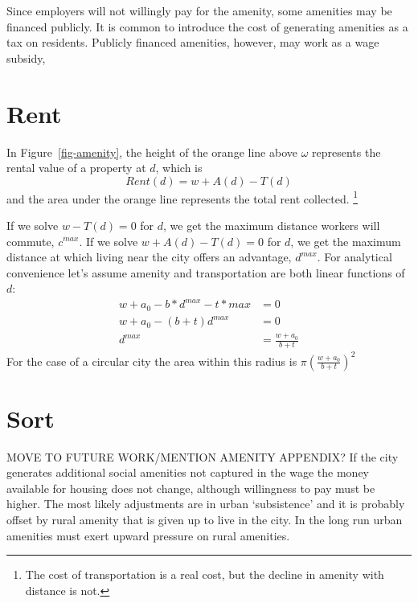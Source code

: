 
Since employers will not willingly pay for the amenity, some amenities may be financed publicly. It is common to introduce the cost of generating amenities as a tax on residents. Publicly financed amenities, however, may work as a wage subsidy,  	

\section{Rent}
In Figure~\ref{fig-amenity}, the height of the orange line above $\omega$ represents the rental value of a property at $d$, which is 
\begin{equation}
Rent(d)  =  w  + A(d) - T(d)	
\label{eqn-rent-at-d}\end{equation}
 and the area under the orange line represents the total rent collected.
 \footnote{The cost of transportation is a real cost, but the decline in amenity with distance is not.}
 
 If we solve $w-T(d)=0$ for $d$, we get the maximum  distance workers will commute, $c^{max}$. 
If we solve $w+A(d)-T(d)=0$ for $d$, we get the maximum  distance at which living near the city offers an advantage, $d^{max}$. For analytical convenience let's assume amenity and transportation are both linear functions of $d$:
\begin{eqnarray}
w+ a_0 - b*d^{max} - t*{max}  	&=0		\nonumber \\
w+a_0 - (b+t)d^{max}  	&=0			\nonumber \\
d^{max}				&= \frac{w+a_0}{b+t}
\end{eqnarray}
For the case of a circular city the area within this radius is $\pi \left(\frac{w+a_0}{b+t}\right)^2$ 



\section{Sort}
{MOVE TO FUTURE WORK/MENTION AMENITY APPENDIX? If the city generates additional social amenities not captured in the wage  the money available for housing does not change, although willingness to pay must be higher. The most likely adjustments are in urban `subsistence' and it is probably offset by rural amenity that is given up to live in the city. In the long run urban amenities must exert upward pressure on rural amenities.} %



